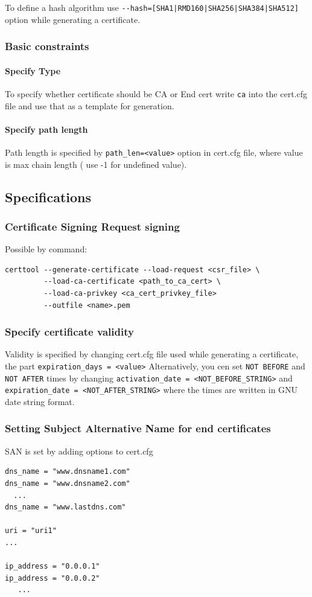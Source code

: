\documentclass[10pt, a4paper]{report}
\begin{document}
To define a hash algorithm use \verb+--hash=[SHA1|RMD160|SHA256|SHA384|SHA512]+ option while generating a certificate.
    
  \subsubsection{Basic constraints}
    
      \paragraph{Specify Type}
To specify whether certificate should be CA or End cert write \verb+ca+ into the cert.cfg file and use that as a template for generation. 
      \paragraph{Specify path length}
Path length is specified by \verb+path_len=<value>+ option in cert.cfg file, where value is max chain length ( use -1 for undefined value).

  \subsection{Specifications}
  
    \subsubsection{Certificate Signing Request signing}
Possible by command:
\begin{verbatim}
certtool --generate-certificate --load-request <csr_file> \
         --load-ca-certificate <path_to_ca_cert> \
         --load-ca-privkey <ca_cert_privkey_file> 
         --outfile <name>.pem
\end{verbatim}

    \subsubsection{Specify certificate validity}
Validity is specified by changing cert.cfg file used while generating a certificate, the part \verb+expiration_days = <value>+
Alternatively, you cen set \verb+NOT BEFORE+ and \verb+NOT AFTER+ times by changing \verb+activation_date = <NOT_BEFORE_STRING>+ and \verb+expiration_date = <NOT_AFTER_STRING>+ where the times are written in GNU date string format.

    \subsubsection{Setting Subject Alternative Name for end certificates}
SAN is set by adding options to cert.cfg
\begin{verbatim}
dns_name = "www.dnsname1.com"
dns_name = "www.dnsname2.com"
  ...
dns_name = "www.lastdns.com"

uri = "uri1"
...

ip_address = "0.0.0.1"
ip_address = "0.0.0.2"
   ...
\end{verbatim}    
\end{document}
